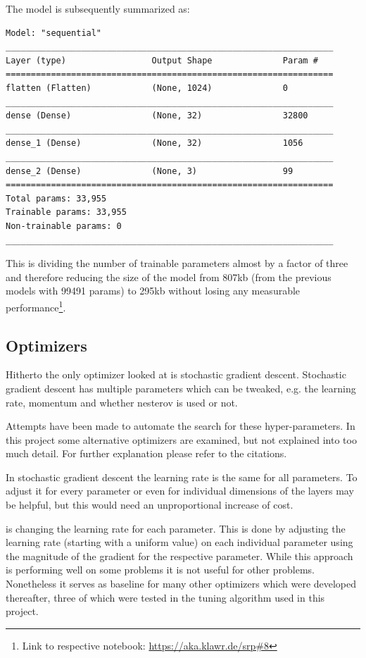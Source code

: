 The model is subsequently summarized as:
\begin{lstlisting}
Model: "sequential"
_________________________________________________________________
Layer (type)                 Output Shape              Param #   
=================================================================
flatten (Flatten)            (None, 1024)              0         
_________________________________________________________________
dense (Dense)                (None, 32)                32800     
_________________________________________________________________
dense_1 (Dense)              (None, 32)                1056      
_________________________________________________________________
dense_2 (Dense)              (None, 3)                 99        
=================================================================
Total params: 33,955
Trainable params: 33,955
Non-trainable params: 0
_________________________________________________________________
\end{lstlisting}

This is dividing the number of trainable parameters almost by a factor of three and therefore reducing the size of the model from 807kb (from the previous models with 99491 params) to 295kb without losing any measurable performance\footnote{Link to respective notebook: \url{https://aka.klawr.de/srp\#8}}.

\subsection{Optimizers}

Hitherto the only optimizer looked at is stochastic gradient descent.
Stochastic gradient descent has multiple parameters which can be tweaked, e.g. the learning rate, momentum and whether nesterov is used or not.

Attempts have been made to automate the search for these hyper-parameters.
In this project some alternative optimizers are examined, but not explained into too much detail.
For further explanation please refer to the citations.

In stochastic gradient descent the learning rate is the same for all parameters.
To adjust it for every parameter or even for individual dimensions of the layers may be helpful, but this would need an unproportional increase of cost.

 \cite{Duchi2010} is changing the learning rate for each parameter.
This is done by adjusting the learning rate (starting with a uniform value) on each individual parameter using the magnitude of the gradient for the respective parameter.
While this approach is performing well on some problems it is not useful for other problems.
Nonetheless it serves as baseline for many other optimizers which were developed thereafter, three of which were tested in the tuning algorithm used in this project.

